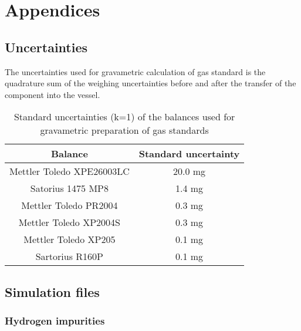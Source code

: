 \chapter*{Appendices}
\section*{Uncertainties}
The uncertainties used for gravametric calculation of gas standard is the quadrature sum of the weighing uncertainties before and after the transfer of the component into the vessel.
\begin{table}[H]
    \centering
    \begin{tabular}{@{}cc@{}}
    \toprule
    Balance                   & Standard uncertainty \\ \midrule
    Mettler Toledo XPE26003LC & 20.0 mg                \\
    Satorius 1475 MP8         & 1.4 mg               \\
    Mettler Toledo PR2004     & 0.3 mg               \\
    Mettler Toledo XP2004S    & 0.3 mg               \\
    Mettler Toledo XP205      & 0.1 mg               \\
    Sartorius R160P           & 0.1 mg               \\ \bottomrule
    \end{tabular}
    \caption*{Standard uncertainties (k=1) of the balances used for gravametric preparation of gas standards}
\end{table}
\section*{Simulation files}
\subsection*{Hydrogen impurities}
